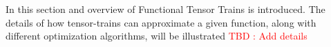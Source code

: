 \documentclass[11pt]{article}
\begin{document}
    In this section and overview of Functional Tensor Trains is introduced.
    The details of how tensor-trains can approximate a given function, along with
    different optimization algorithms, will be illustrated
    \textcolor{red}{TBD : Add details}
\end{document}
